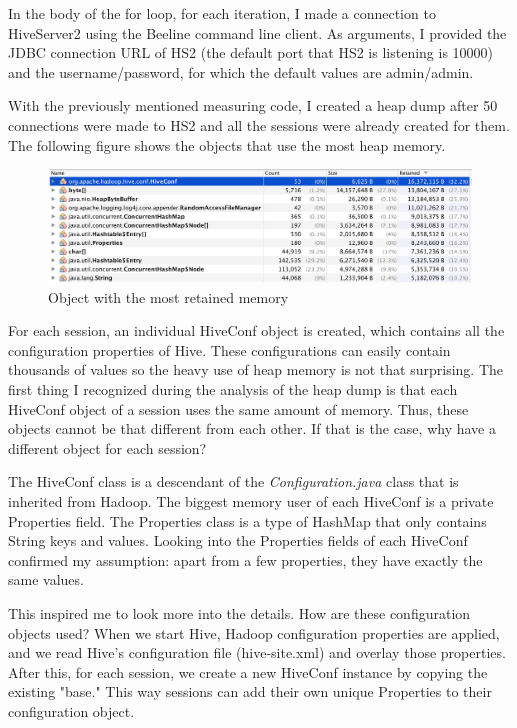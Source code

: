 In the body of the for loop, for each iteration, I made a connection to HiveServer2 using the Beeline command line client. As arguments, I provided the JDBC connection URL of HS2 (the default port that HS2 is listening is 10000) and the username/password, for which the default values are admin/admin.

With the previously mentioned measuring code, I created a heap dump after 50 connections were made to HS2 and all the sessions were already created for them. The following figure shows the objects that use the most heap memory.


\begin{figure}[H]
	\includegraphics[width=150mm, keepaspectratio]{figures/hiveconf_memory.png}
	\centering
	\caption{Object with the most retained memory}
\end{figure}

For each session, an individual HiveConf object is created, which contains all the configuration properties of Hive. These configurations can easily contain thousands of values so the heavy use of heap memory is not that surprising. The first thing I recognized during the analysis of the heap dump is that each HiveConf object of a session uses the same amount of memory. Thus, these objects cannot be that different from each other. If that is the case, why have a different object for each session?

The HiveConf class is a descendant of the \textit{Configuration.java} class that is inherited from Hadoop. The biggest memory user of each HiveConf is a private Properties field. The Properties class is a type of HashMap that only contains String keys and values. Looking into the Properties fields of each HiveConf confirmed my assumption:  apart from a few properties, they have exactly the same values.

This inspired me to look more into the details. How are these configuration objects used? When we start Hive, Hadoop configuration properties are applied, and we read Hive's configuration file (hive-site.xml) and overlay those properties. After this, for each session, we create a new HiveConf instance by copying the existing "base." This way sessions can add their own unique Properties to their configuration object. 

